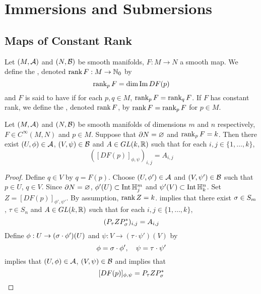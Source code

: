 \documentclass{book}
\begin{document}
	
	
	
	
	
	
	
	
	
	
	
	
	
	
	
	
	
	
	
	
	\newpage
	\chapter{Immersions and Submersions}
	
	\section{Maps of Constant Rank}
	
	
	\begin{defn} 
		Let $(M, \mathcal{A})$ and $(N, \mathcal{B})$ be smooth manifolds, $F: M \rightarrow N$ a smooth map. We define the , denoted $\operatorname{\text{rank}} F: M \rightarrow \mathbb{N}_0$ by 
		$$\operatorname{\text{rank}}_p F = \dim \text{Im} \, D F(p)$$
		and $F$ is said to have   if for each $p, q \in M$, $\operatorname{\text{rank}}_p F = \operatorname{\text{rank}}_q F$. If $F$ has constant rank, we define the , denoted $\operatorname{\text{rank}} F$, by $\operatorname{\text{rank}} F = \operatorname{\text{rank}}_p F$ for $p \in M$.
	\end{defn}

	\begin{ex} 
		Let $(M, \mathcal{A})$ and $(N, \mathcal{B})$ be smooth manifolds of dimensions $m$ and $n$ respectively, $F \in C^{\infty}(M,N)$ and $p \in M$. Suppose that $\partial N = \varnothing$ and $\operatorname{\text{rank}}_p F = k$. Then there exist $(U, \phi) \in \mathcal{A}$, $(V, \psi) \in \mathcal{B}$ and $A \in GL(k, \mathbb{R})$ such that for each $i,j \in \{1, \ldots, k\}$, 
		$$([DF(p)]_{\phi, \psi})_{i,j} = A_{i,j} $$
	\end{ex}
	
	\begin{proof}
		Define $q \in V$ by $q = F(p)$. Choose $(U, \phi') \in \mathcal{A}$ and $(V, \psi') \in \mathcal{B}$ such that $p \in U$, $q \in V$. Since $\partial N = \varnothing$, $\phi'(U) \subset \operatorname{Int} \mathbb{H}^m_j$ and $\psi'(V) \subset \operatorname{Int} \mathbb{H}^n_k$. Set $Z = [DF(p)]_{\phi', \psi'}$. By assumption, $\operatorname{\text{rank}} Z = k$.  implies that there exist $\sigma \in S_{m}$, $\tau \in S_{n}$ and $A \in GL(k, \mathbb{R})$ such that for each $i,j \in \{1, \ldots, k\}$, 
		$$(P_{\tau} Z P_{\sigma}^*)_{i, j} = A_{i,j}$$
		Define $\phi: U \rightarrow (\sigma \cdot \phi')(U)$ and $\psi: V \rightarrow (\tau \cdot \psi')(V)$ by 
		$$\phi = \sigma \cdot \phi' , \quad \psi = \tau \cdot \psi'$$ 
		 implies that $(U, \phi) \in \mathcal{A}$, $(V, \psi) \in \mathcal{B}$ and  implies that
		$$[DF(p)]_{\phi, \psi} = P_{\tau} Z P_{\sigma}^*$$
	\end{proof}
	
\end{document}
